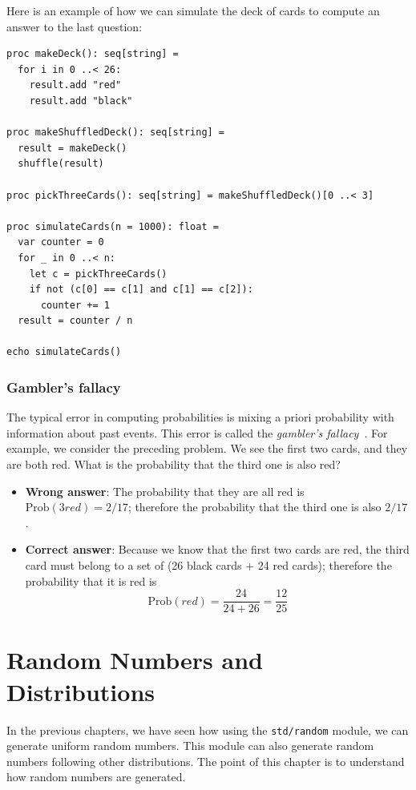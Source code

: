 \documentclass[justified, sixbynine]{tufte-book}
\def\ft{\small\tt}
\theoremstyle{plain}%
\newtheorem * {corollary}{Corollary}
\theoremstyle{definition}
\theoremstyle{remark}
\newtheorem * {remark}{Remark}
\newtheorem * {note}{Note}
\begin{document}
\begin{fullwidth}
Here is an example of how we can simulate the deck of cards to compute an answer to the last question:

\begin{lstlisting}
proc makeDeck(): seq[string] =
  for i in 0 ..< 26:
    result.add "red"
    result.add "black"

proc makeShuffledDeck(): seq[string] =
  result = makeDeck()
  shuffle(result)

proc pickThreeCards(): seq[string] = makeShuffledDeck()[0 ..< 3]

proc simulateCards(n = 1000): float =
  var counter = 0
  for _ in 0 ..< n:
    let c = pickThreeCards()
    if not (c[0] == c[1] and c[1] == c[2]):
      counter += 1
  result = counter / n

echo simulateCards()
\end{lstlisting}

\goodbreak\subsection{Gambler's fallacy}

The typical error in computing probabilities is mixing a priori probability
with information about past events.
This error is called the {\it gambler's fallacy}~\cite{gambler}.
For example, we consider the preceding problem. We see the first two cards, and they are both red. What is the
probability that the third one is also red?

\begin{itemize}
\item  {\bf Wrong answer}: The probability that they are all red is $%
\textrm{Prob}(3red)=2/17$; therefore the probability that the third one is also $2/17$.

\item  {\bf Correct answer}: Because we know that the first two cards are red, the third card must belong to a set of (26 black cards + 24 red cards);
therefore the probability that it is red is
\begin{equation}
\textrm{Prob}(red)=\frac{24}{24+26}=\frac{12}{25}
\end{equation}
\end{itemize}

\chapter{Random Numbers and Distributions}

In the previous chapters, we have seen how using the {\ft std/random} module, we can generate uniform random numbers. This module can also
generate random numbers following other distributions.
The point of this chapter is to understand how random numbers are generated.


\end{fullwidth}
\end{document}
